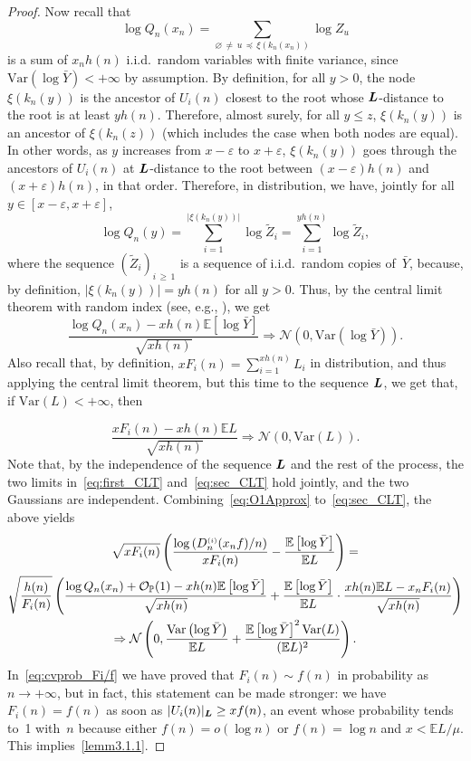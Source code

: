 \documentclass[AHL,Unicode,longabstracts,published]{cedram}
\newcommand{\bs}{\ensuremath{\boldsymbol}}
\newcommand{\sss}{\ensuremath{\scriptscriptstyle}}
\newcommand{\Op}{{\mathcal O_{\bbP}}}
\newcommand{\bbP}{\mathbb{P}}
\newcommand{\bbE}{\mathbb{E}}
\newcommand{\clN}{\mathcal{N}}
\newcommand{\Var}{\mathrm{Var}}
\begin{document}
\begin{proof}
Now recall that
\[
\log Q_n(x_n) = \sum_{\varnothing\,\neq\,u\,\preccurlyeq\,\xi(k_n(x_n))} \log Z_u
\]
is a sum of $x_n h(n)$ i.i.d.\ random variables with finite variance, since $\Var(\log \bar Y) <+\infty$ by assumption. By definition, for all $y>0$, the node $\xi(k_n(y))$ is the ancestor of $U_i(n)$ closest to the root whose $\bs L$-distance to the root is at least $yh(n)$. Therefore, almost surely, for all $y\leq z$, $\xi(k_n(y))$ is an ancestor of $\xi(k_n(z))$ (which includes the case when both nodes are equal). In other words, as $y$ increases from $x-\varepsilon$ to $x+\varepsilon$, $\xi(k_n(y))$ goes through the ancestors of $U_i(n)$ at $\bs L$-distance to the root between $(x-\varepsilon)h(n)$ and $(x+\varepsilon)h(n)$, in that order. Therefore, in distribution, we have, jointly for all $y\in[x-\varepsilon,x+\varepsilon]$,
\[
\log Q_n(y) = \sum_{i=1}^{|\xi(k_n(y))|}\log \widetilde Z_i = \sum_{i=1}^{yh(n)}\log \widetilde Z_i,
\]
where the sequence $(\widetilde Z_i)_{i\,\geq\,1}$ is a sequence of i.i.d.\ random copies of~$\bar Y$, because, by definition, $|\xi(k_n(y))| = yh(n)$ for all $y>0$. Thus, by the central limit theorem with random index (see, e.g., \cite[Theorem~3.2, Chapter~7]{Gut}), we get
\begin{equation}\label{eq:first_CLT}
\frac{\log Q_n(x_n) - xh(n)\bbE\left[\log\bar Y\right]}{\sqrt{xh(n)}}
\Rightarrow \clN\left(0,\Var(\log \bar Y)\right).
\end{equation}
Also recall that, by definition, $xF_i(n) = \sum_{i=1}^{xh(n)} L_i$ in distribution, and thus applying the central limit theorem, but this time to the sequence $\bs L$, we get that, if $\Var(L)<+\infty$, then

\begin{equation}\label{eq:sec_CLT}
\frac{xF_i(n)-xh(n)\bbE L}{\sqrt{xh(n)}} \Rightarrow \clN(0,\Var(L)).
\end{equation}
Note that, by the independence of the sequence $\bs L$ and the rest of the process, the two limits in~\eqref{eq:first_CLT} and~\eqref{eq:sec_CLT} hold jointly, and the two Gaussians are independent. Combining~\eqref{eq:O1Approx} to~\eqref{eq:sec_CLT}, the above yields
\begin{multline*}
\sqrt{xF_i(n)}\left(\frac{\log \left(D_n^{\sss (i)}(x_n f)/n\right)}{xF_i(n)} - \frac{\bbE\left[\log \bar Y\right]}{\bbE L}\right)=\\
\sqrt{\frac{h(n)}{F_i(n)}} \left(\frac{\log Q_n(x_n) +\Op(1)-xh(n)\bbE\left[\log\bar Y\right]}{\sqrt{xh(n)}} +\frac{\bbE\left[\log \bar Y\right]}{\bbE L}\cdot \frac{xh(n)\bbE L - x_n F_i(n)}{\sqrt{xh(n)}}\right)\\
\Rightarrow \clN\left(0,\frac{\Var\left(\log \bar Y\right)}{\bbE L}+\frac{\bbE\left[\log \bar Y\right]^2\Var(L)}{(\bbE L)^2}\right).
\end{multline*}
In~\eqref{eq:cvprob_Fi/f} we have proved that $F_i(n)\sim f(n)$ in probability as $n\to+\infty$, but in fact, this statement can be made stronger: we have $F_i(n) = f(n)$ as soon as $|U_i(n)|_{\bs L}\geq xf(n)$, an event whose probability tends to~1 with~$n$ because either $f(n)= o(\log n)$ or $f(n) = \log n$ and $x<\bbE L/\mu$. This implies~\eqref{lemm3.1.1}.


\end{proof}
\end{document}
